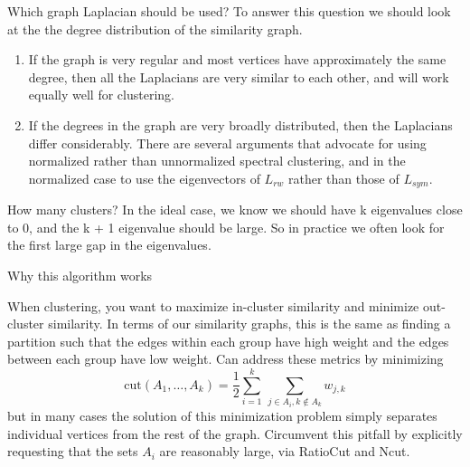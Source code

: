 \documentclass{beamer}
\begin{document}
\begin{frame}{Which graph Laplacian should be used?}
    To answer this question we should look at the the degree distribution of the similarity graph.     
    \begin{enumerate}
        \item If the graph is very regular and most vertices have approximately the same degree, then all the Laplacians are very similar to each other, and will
    work equally well for clustering. 
    \item If the degrees in the graph are very broadly distributed,
    then the Laplacians differ considerably. There are several arguments that advocate for using normalized rather than unnormalized spectral clustering, and in the normalized case to use the eigenvectors of $L_{rw}$ rather than those of $L_{sym}$.
    \end{enumerate} 
\end{frame}

\begin{frame}{How many clusters?}
In the ideal case, we know we
should have k eigenvalues close to 0, and the k + 1 eigenvalue should be large. So in practice we often look for the first large gap in the eigenvalues.
\end{frame}




\begin{frame}{Why this algorithm works}
    \begin{outline}
        \1 When clustering, you want to maximize in-cluster similarity and minimize out-cluster similarity. In terms of our similarity graphs, this is the same as finding a partition such that the edges within each group have high weight and the edges between each group have low weight.
        \1 Can address these metrics by minimizing 
        $$
        \textrm{cut}(A_1, \dots, A_k) = \frac{1}{2} \sum_{i=1}^k \, \sum_{j \in A_i, k \not \in A_k} w_{j, k}
        $$
        but in many cases the solution of this minimization problem simply separates individual vertices from the rest of the graph.
        \1 Circumvent this pitfall by explicitly requesting that the sets $A_i$ are reasonably large, via RatioCut and Ncut.
    \end{outline}
\end{frame}
\end{document}
